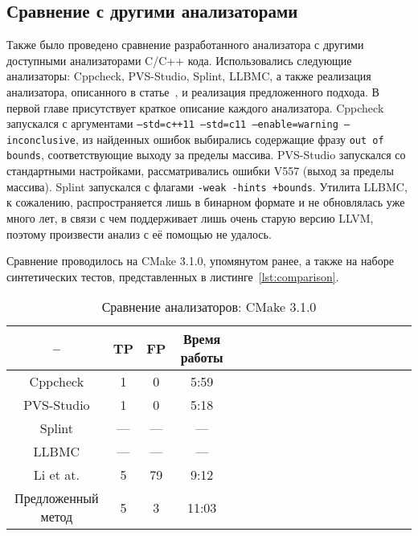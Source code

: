 \subsection{Сравнение с другими анализаторами}

Также было проведено сравнение разработанного анализатора с другими
доступными анализаторами C/C++ кода. Использовались следующие
анализаторы: Cppcheck, PVS-Studio, Splint, LLBMC, а
также реализация анализатора, описанного в
статье~\cite{li2010practical}, и реализация предложенного подхода. В
первой главе присутствует краткое описание каждого
анализатора. Cppcheck запускался с аргументами \texttt{--std=c++11
  --std=c11 --enable=warning --inconclusive}, из найденных ошибок
выбирались содержащие фразу \texttt{out of bounds}, соответствующие
выходу за пределы массива. PVS-Studio запускался со стандартными
настройками, рассматривались ошибки V557 (выход за пределы
массива). Splint запускался с флагами \texttt{-weak -hints
  +bounds}. Утилита LLBMC, к сожалению, распространяется лишь в
бинарном формате и не обновлялась уже много лет, в связи с чем
поддерживает лишь очень старую версию LLVM, поэтому произвести анализ
с её помощью не удалось.

Сравнение проводилось на CMake 3.1.0, упомянутом ранее, а также на
наборе синтетических тестов, представленных в
листинге~\ref{lst:comparison}.

\begin{table}[!h]
\caption{Сравнение анализаторов: CMake 3.1.0}\label{tab:comparison-cmake}
\centering
  \begin{tabular}{|*{18}{c|}}\hline
  --                 & TP  & FP  & Время работы \\\hline
  Cppcheck           & 1   & 0   & 5:59         \\\hline
  PVS-Studio         & 1   & 0   & 5:18         \\\hline
  Splint             & --- & --- & ---          \\\hline
  LLBMC              & --- & --- & ---          \\\hline
  Li et at.          & 5   & 79  & 9:12         \\\hline
  Предложенный метод & 5   & 3   & 11:03        \\\hline
  \end{tabular}
\end{table}

